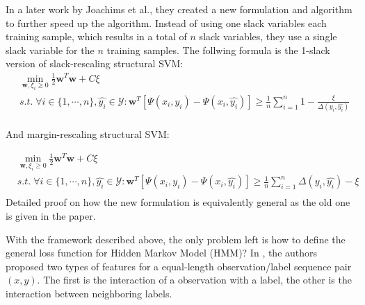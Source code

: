 In a later work by Joachims et al.\cite{svm2009}, they created a new formulation and algorithm to further speed up the algorithm. Instead of using one slack variables each training sample, which results in a total of $n$ slack variables, they use a single slack variable for the $n$ training samples. The follwing formula is the 1-slack version of slack-rescaling structural SVM:
$$
\begin{aligned}
    & \min_{\mathbf{w}, \xi_i \geq 0} \frac{1}{2}\mathbf{w}^T\mathbf{w} + C \xi\\
    &s.t.\; \forall i \in \{1,\cdots,n\},\hat{y_i} \in \mathcal{Y}: \mathbf{w}^T[\Psi(x_i,y_i) - \Psi(x_i,\hat{y_i})] \geq \frac{1}{n}\sum^n_{i=1}1 - \frac{\xi}{\Delta(y_i, \hat{y_i})} \\
\end{aligned}
$$

And margin-rescaling structural SVM:

$$
\begin{aligned}
    & \min_{\mathbf{w}, \xi_i \geq 0} \frac{1}{2}\mathbf{w}^T\mathbf{w} + C \xi\\
    & s.t.\; \forall i \in \{1,\cdots,n\},\hat{y_i} \in \mathcal{Y}: \mathbf{w}^T[\Psi(x_i,y_i) - \Psi(x_i,\hat{y_i})] \geq \frac{1}{n}\sum^n_{i=1}\Delta(y_i, \hat{y_i}) - \xi \\
\end{aligned}
$$
%
Detailed proof on how the new formulation is equivalently general as the old one is given in the paper.

With the framework described above, the only problem left is how to define the general loss function for Hidden Markov Model (HMM)? In \cite{hmm2003}, the authors proposed two types of features for a equal-length observation/label sequence pair $(x,y)$. The first is the interaction of a observation with a label, the other is the interaction between neighboring labels. 

